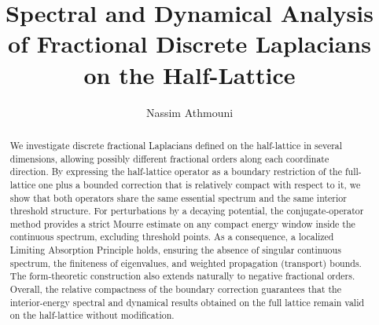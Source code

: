 \documentclass[10pt]{amsart}
\newcommand{\1}{{\mathbb{I}}}
\numberwithin{equation}{section}
\begin{document}
\title[Spectral and dynamical analysis]
{Spectral and Dynamical Analysis of Fractional Discrete Laplacians on the Half-Lattice}


\author{Nassim Athmouni}
\address{Université de Gafsa, Campus Universitaire 2112, Tunisie}




\makeatletter
{}
\makeatother


\begin{abstract}
We investigate discrete fractional Laplacians defined on the half-lattice in several dimensions, allowing possibly different fractional orders along each coordinate direction.
By expressing the half-lattice operator as a boundary restriction of the full-lattice one plus a bounded correction that is relatively compact with respect to it, we show that both operators share the same essential spectrum and the same interior threshold structure.
For perturbations by a decaying potential, the conjugate-operator method provides a strict Mourre estimate on any compact energy window inside the continuous spectrum, excluding threshold points.
As a consequence, a localized Limiting Absorption Principle holds, ensuring the absence of singular continuous spectrum, the finiteness of eigenvalues, and weighted propagation (transport) bounds.
The form-theoretic construction also extends naturally to negative fractional orders.
Overall, the relative compactness of the boundary correction guarantees that the interior-energy spectral and dynamical results obtained on the full lattice remain valid on the half-lattice without modification.
\end{abstract}







\maketitle
\tableofcontents
\end{document}
